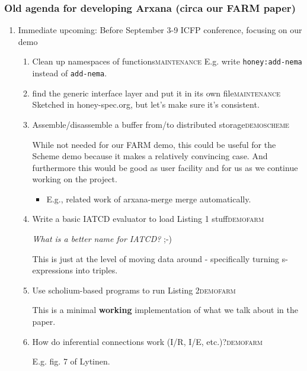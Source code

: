 \documentclass[11pt]{article}
\begin{document}
\subsubsection{Old agenda for developing Arxana (circa our FARM paper)}
\label{sec:org2040e89}
\begin{enumerate}
\item Immediate upcoming: Before September 3-9 ICFP conference, focusing on our demo
\label{sec:orgabfd319}
\begin{enumerate}
\item Clean up namespaces of functions\hfill{}\textsc{maintenance}
\label{sec:orgcb4bc2c}
E.g. write \texttt{honey:add-nema} instead of \texttt{add-nema}.
\item find the generic interface layer and put it in its own file\hfill{}\textsc{maintenance}
\label{sec:org1c7ebd3}
Sketched in honey-spec.org, but let's make sure it's consistent.
\item Assemble/disassemble a buffer from/to distributed storage\hfill{}\textsc{demoscheme}
\label{sec:orgf44f2a4}

While not needed for our FARM demo, this could be useful for the
Scheme demo because it makes a relatively convincing case.  And
furthermore this would be good as user facility and for us as we
continue working on the project.

\begin{itemize}
\item E.g., related work of arxana-merge merge automatically.
\end{itemize}

\item Write a basic IATCD evaluator to load Listing 1 stuff\hfill{}\textsc{demofarm}
\label{sec:orgeafc982}

\emph{What is a better name for IATCD?} ;-)

This is just at the level of moving data around - specifically turning
s-expressions into triples.

\item Use scholium-based programs to run Listing 2\hfill{}\textsc{demofarm}
\label{sec:org7bb9a00}

This is a minimal \textbf{working} implementation of what we talk about in the paper.

\item How do inferential connections work (I/R, I/E, etc.)?\hfill{}\textsc{demofarm}
\label{sec:org0163a18}

E.g. fig. 7 of Lytinen.


\end{enumerate}
\end{enumerate}
\end{document}
